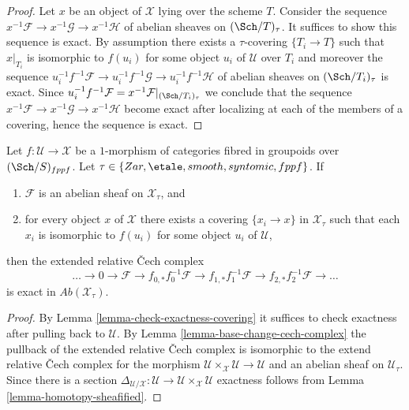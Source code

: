 \begin{proof}
Let $x$ be an object of $\mathcal{X}$ lying over the scheme $T$.
Consider the sequence
$x^{-1}\mathcal{F} \to x^{-1}\mathcal{G} \to x^{-1}\mathcal{H}$
of abelian sheaves on $(\Sch/T)_\tau$. It suffices to show
this sequence is exact. By assumption there exists a $\tau$-covering
$\{T_i \to T\}$ such that $x|_{T_i}$ is isomorphic to $f(u_i)$ for
some object $u_i$ of $\mathcal{U}$ over $T_i$ and moreover the sequence
$u_i^{-1}f^{-1}\mathcal{F} \to u_i^{-1}f^{-1}\mathcal{G} \to
u_i^{-1}f^{-1}\mathcal{H}$ of abelian sheaves on $(\Sch/T_i)_\tau$
is exact. Since
$u_i^{-1}f^{-1}\mathcal{F} = x^{-1}\mathcal{F}|_{(\Sch/T_i)_\tau}$
we conclude that the sequence
$x^{-1}\mathcal{F} \to x^{-1}\mathcal{G} \to x^{-1}\mathcal{H}$
become exact after localizing at each of the members of a covering,
hence the sequence is exact.
\end{proof}

\begin{proposition}
\label{proposition-exactness-cech-complex}
Let $f : \mathcal{U} \to \mathcal{X}$ be a $1$-morphism of categories fibred
in groupoids over $(\Sch/S)_{fppf}$. Let
$\tau \in \{Zar, \etale, smooth, syntomic, fppf\}$.
If
\begin{enumerate}
\item $\mathcal{F}$ is an abelian sheaf on $\mathcal{X}_\tau$, and
\item for every object $x$ of $\mathcal{X}$ there exists a covering
$\{x_i \to x\}$ in $\mathcal{X}_\tau$ such that each $x_i$ is isomorphic
to $f(u_i)$ for some object $u_i$ of $\mathcal{U}$,
\end{enumerate}
then the extended relative {\v C}ech complex
$$
\ldots \to 0 \to
\mathcal{F} \to
f_{0, *}f_0^{-1}\mathcal{F} \to
f_{1, *}f_1^{-1}\mathcal{F} \to
f_{2, *}f_2^{-1}\mathcal{F} \to \ldots
$$
is exact in $\textit{Ab}(\mathcal{X}_\tau)$.
\end{proposition}

\begin{proof}
By
Lemma \ref{lemma-check-exactness-covering}
it suffices to check exactness after pulling back to $\mathcal{U}$.
By
Lemma \ref{lemma-base-change-cech-complex}
the pullback of the extended relative {\v C}ech complex is isomorphic
to the extend relative {\v C}ech complex for the morphism
$\mathcal{U} \times_\mathcal{X} \mathcal{U} \to \mathcal{U}$
and an abelian sheaf on $\mathcal{U}_\tau$. Since there is a section
$\Delta_{\mathcal{U}/\mathcal{X}} : \mathcal{U} \to
\mathcal{U} \times_\mathcal{X} \mathcal{U}$ exactness follows from
Lemma \ref{lemma-homotopy-sheafified}.
\end{proof}

